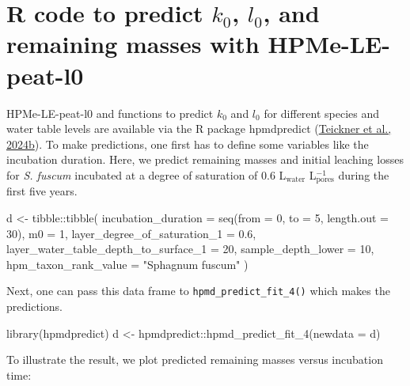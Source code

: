 \documentclass[
  12pt,
]{article}
\newenvironment{Shaded}{\begin{snugshade}}{\end{snugshade}}
\newcommand{\AttributeTok}[1]{\textcolor[rgb]{0.77,0.63,0.00}{#1}}
\newcommand{\DecValTok}[1]{\textcolor[rgb]{0.00,0.00,0.81}{#1}}
\newcommand{\FloatTok}[1]{\textcolor[rgb]{0.00,0.00,0.81}{#1}}
\newcommand{\FunctionTok}[1]{\textcolor[rgb]{0.00,0.00,0.00}{#1}}
\newcommand{\NormalTok}[1]{#1}
\newcommand{\OtherTok}[1]{\textcolor[rgb]{0.56,0.35,0.01}{#1}}
\newcommand{\SpecialCharTok}[1]{\textcolor[rgb]{0.00,0.00,0.00}{#1}}
\newcommand{\StringTok}[1]{\textcolor[rgb]{0.31,0.60,0.02}{#1}}
\begin{document}
\hypertarget{sup-7}{%
\section{\texorpdfstring{R code to predict \(k_0\), \(l_0\), and remaining masses with HPMe-LE-peat-l0}{R code to predict k\_0, l\_0, and remaining masses with HPMe-LE-peat-l0}}\label{sup-7}}

HPMe-LE-peat-l0 and functions to predict \(k_0\) and \(l_0\) for different species and water table levels are available via the R package hpmdpredict (\protect\hyperlink{ref-Teickner.2024b}{Teickner et al., 2024b}). To make predictions, one first has to define some variables like the incubation duration. Here, we predict remaining masses and initial leaching losses for \emph{S. fuscum} incubated at a degree of saturation of 0.6 L\(_\text{water}\) L\(_\text{pores}^{-1}\) during the first five years.

\begin{Shaded}
\begin{Highlighting}[]
\NormalTok{d }\OtherTok{\textless{}{-}} 
\NormalTok{  tibble}\SpecialCharTok{::}\FunctionTok{tibble}\NormalTok{(}
    \AttributeTok{incubation\_duration =} \FunctionTok{seq}\NormalTok{(}\AttributeTok{from =} \DecValTok{0}\NormalTok{, }\AttributeTok{to =} \DecValTok{5}\NormalTok{, }\AttributeTok{length.out =} \DecValTok{30}\NormalTok{),}
    \AttributeTok{m0 =} \DecValTok{1}\NormalTok{,}
    \AttributeTok{layer\_degree\_of\_saturation\_1 =} \FloatTok{0.6}\NormalTok{,}
    \AttributeTok{layer\_water\_table\_depth\_to\_surface\_1 =} \DecValTok{20}\NormalTok{,}
    \AttributeTok{sample\_depth\_lower =} \DecValTok{10}\NormalTok{,}
    \AttributeTok{hpm\_taxon\_rank\_value =} \StringTok{"Sphagnum fuscum"}
\NormalTok{  )}
\end{Highlighting}
\end{Shaded}

Next, one can pass this data frame to \texttt{hpmd\_predict\_fit\_4()} which makes the predictions.

\begin{Shaded}
\begin{Highlighting}[]
\FunctionTok{library}\NormalTok{(hpmdpredict)}
\NormalTok{d }\OtherTok{\textless{}{-}}\NormalTok{ hpmdpredict}\SpecialCharTok{::}\FunctionTok{hpmd\_predict\_fit\_4}\NormalTok{(}\AttributeTok{newdata =}\NormalTok{ d)}
\end{Highlighting}
\end{Shaded}

To illustrate the result, we plot predicted remaining masses versus incubation time:
\end{document}
